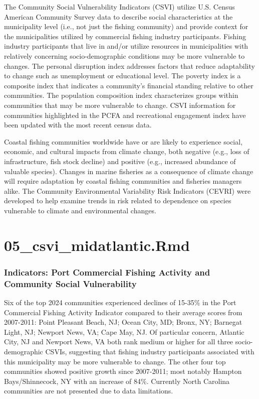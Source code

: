 \documentclass[
  10pt,
]{article}
\begin{document}
The Community Social Vulnerability Indicators (CSVI) utilize U.S. Census American Community Survey data to describe social characteristics at the municipality level (i.e., not just the fishing community) and provide context for the municipalities utilized by commercial fishing industry participants. Fishing industry participants that live in and/or utilize resources in municipalities with relatively concerning socio-demographic conditions may be more vulnerable to changes. The personal disruption index addresses factors that reduce adaptability to change such as unemployment or educational level. The poverty index is a composite index that indicates a community's financial standing relative to other communities. The population composition index characterizes groups within communities that may be more vulnerable to change. CSVI information for communities highlighted in the PCFA and recreational engagement index have been updated with the most recent census data.

Coastal fishing communities worldwide have or are likely to experience social, economic, and cultural impacts from climate change, both negative (e.g., loss of infrastructure, fish stock decline) and positive (e.g., increased abundance of valuable species). Changes in marine fisheries as a consequence of climate change will require adaptation by coastal fishing communities and fisheries managers alike. The Community Environmental Variability Risk Indicators (CEVRI) were developed to help examine trends in risk related to dependence on species vulnerable to climate and environmental changes.

\section{05\_csvi\_midatlantic.Rmd}\label{csvi_midatlantic.rmd}

\subsubsection{Indicators: Port Commercial Fishing Activity and Community Social Vulnerability}\label{indicators-port-commercial-fishing-activity-and-community-social-vulnerability}

Six of the top 2024 communities experienced declines of 15-35\% in the Port Commercial Fishing Activity Indicator compared to their average scores from 2007-2011: Point Pleasant Beach, NJ; Ocean City, MD; Bronx, NY; Barnegat Light, NJ; Newport News, VA; Cape May, NJ. Of particular concern, Atlantic City, NJ and Newport News, VA both rank medium or higher for all three socio-demographic CSVIs, suggesting that fishing industry participants associated with this municipality may be more vulnerable to change. The other four top communities showed positive growth since 2007-2011; most notably Hampton Bays/Shinnecock, NY with an increase of 84\%. Currently North Carolina communities are not presented due to data limitations.
\end{document}
